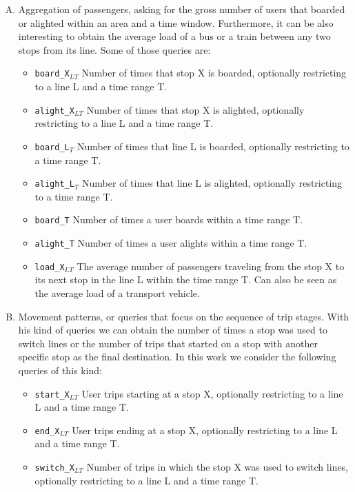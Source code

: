 \documentclass[runningheads]{llncs}
\begin{document}
\begin{enumerate}[A)]
    \item Aggregation of passengers, asking for the gross number of users that boarded or alighted within an area and a time window. Furthermore, it can be also interesting to obtain the average load of a bus or a train between any two stops from its line. Some of those queries are:
    \begin{itemize}
        \item \texttt{board\_X$_{LT}$} Number of times that stop X is boarded, optionally restricting to a line L and a time range T.
        \item \texttt{alight\_X$_{LT}$} Number of times that stop X is alighted, optionally restricting to a line L and a time range T.
        \item \texttt{board\_L$_T$}  Number of times that line L is boarded, optionally restricting to a time range T.
        \item \texttt{alight\_L$_T$} Number of times that line L is alighted, optionally restricting to a time range T.
        \item \texttt{board\_T} Number of times a user boards within a time range T.
        \item \texttt{alight\_T} Number of times a user alights within a time range T.
        \item \texttt{load\_X$_{LT}$} The average number of passengers traveling from the stop X to its next stop in the line L within the time range T. Can also be seen as the average load of a transport vehicle.
    \end{itemize}
    \item Movement patterns, or queries that focus on the sequence of trip stages. With his kind of queries we can obtain the number of times a stop was used to switch lines or the number of trips that started on a stop with another specific stop as the final destination. In this work we consider the following queries of this kind:
    \begin{itemize}
        \item \texttt{start\_X$_{LT}$} User trips starting at a stop X, optionally restricting to a line L and a time range T.
        \item \texttt{end\_X$_{LT}$} User trips ending at a stop X, optionally restricting to a line L and a time range T.
        \item \texttt{switch\_X$_{LT}$} Number of trips in which the stop X was used to switch lines, optionally restricting to a line L and a time range T.

\end{itemize}
\end{enumerate}
\end{document}
